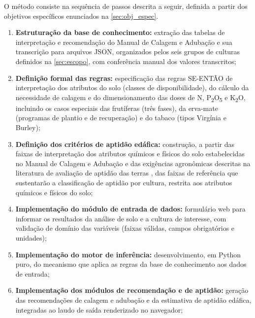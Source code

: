O método consiste na sequência de passos descrita a seguir, definida
a partir dos objetivos específicos enunciados na \cref{sec:obj_espec}.

\begin{enumerate}[label=\alph*),leftmargin=3em]

  \item \textbf{Estruturação da base de conhecimento:} extração das
    tabelas de interpretação e recomendação do Manual de Calagem e
    Adubação \citep{ManualCalagem2016} e sua transcrição para arquivos
    JSON, organizados pelos seis grupos de culturas definidos na
    \cref{sec:escopo}, com conferência manual dos valores transcritos;

  \item \textbf{Definição formal das regras:} especificação das regras
    SE-ENTÃO de interpretação dos atributos do solo (classes de
    disponibilidade), do cálculo da necessidade de calagem e do
    dimensionamento das doses de N, P\textsubscript{2}O\textsubscript{5}
    e K\textsubscript{2}O, incluindo os casos especiais das frutíferas
    (três fases), da erva-mate (programas de plantio e de recuperação)
    e do tabaco (tipos Virgínia e Burley);

  \item \textbf{Definição dos critérios de aptidão edáfica:} construção,
    a partir das faixas de interpretação dos atributos químicos e físicos
    do solo estabelecidas no Manual de Calagem e Adubação
    \citep{ManualCalagem2016} e das exigências agronômicas descritas na
    literatura de avaliação de aptidão das terras
    \citep{EmbrapaAptidao2025, Hofig2015}, das faixas de referência
    que sustentarão a classificação de aptidão por cultura, restrita aos
    atributos químicos e físicos do solo;

  \item \textbf{Implementação do módulo de entrada de dados:} formulário
    web para informar os resultados da análise de solo e a cultura de
    interesse, com validação de domínio das variáveis (faixas válidas,
    campos obrigatórios e unidades);

  \item \textbf{Implementação do motor de inferência:} desenvolvimento,
    em Python puro, do mecanismo que aplica as regras da base de
    conhecimento aos dados de entrada;

  \item \textbf{Implementação dos módulos de recomendação e de aptidão:}
    geração das recomendações de calagem e adubação e da estimativa de
    aptidão edáfica, integradas ao laudo de saída renderizado no
    navegador;


\end{enumerate}
